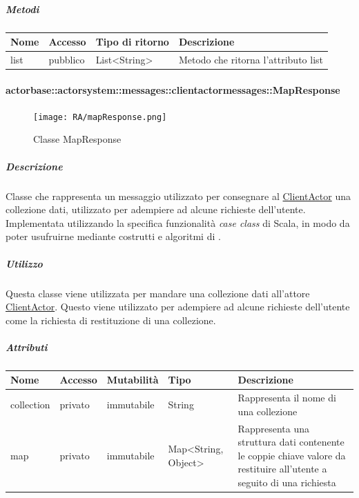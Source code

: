 \documentclass{scalatekids-article}
\begin{document}
\subparagraph{Metodi}
\begin{tabular}{| l | l | l | l |}
  \hline
  Nome & Accesso & Tipo di ritorno & Descrizione\\
  \hline
  list & pubblico & List<String> & Metodo che ritorna l'attributo list\\
  \hline
\end{tabular}

\paragraph{actorbase::actorsystem::messages::clientactormessages::MapResponse}
\label{sec:actorbase::actorsystem::messages::clientactormessages::MapResponse}

\begin{figure}[H]
  \begin{center}
    \texttt{[image: RA/mapResponse.png]}
    \caption{Classe MapResponse}
  \end{center}
\end{figure}

\subparagraph{Descrizione}
Classe che rappresenta un messaggio utilizzato per consegnare al
\hyperref[sec:actorbase::actorsystem::actors::clientactor::ClientActor]{ClientActor} una collezione dati, utilizzato per adempiere ad alcune
richieste dell'utente.\\Implementata utilizzando la specifica funzionalità \textit{case class} di Scala,
in modo da poter usufruirne mediante costrutti e algoritmi di
.

\subparagraph{Utilizzo}
Questa classe viene utilizzata per mandare una collezione dati all'attore
\hyperref[sec:actorbase::actorsystem::actors::clientactor::ClientActor]{ClientActor}.
Questo viene utilizzato per adempiere ad alcune richieste dell'utente come
la richiesta di restituzione di una collezione.

\subparagraph{Attributi}
\begin{tabular}{| p{2cm} | p{1.5cm} | p{2cm} | p{3cm} | p{8.5cm} |}
  \hline
  Nome & Accesso & Mutabilità & Tipo & Descrizione\\
  \hline
  collection & privato & immutabile & String & Rappresenta il nome di una collezione\\
  \hline
  map & privato & immutabile & Map<String, Object> & Rappresenta una struttura dati contenente le coppie chiave valore da restituire all'utente a seguito di una richiesta\\
  \hline
\end{tabular}
\end{document}
